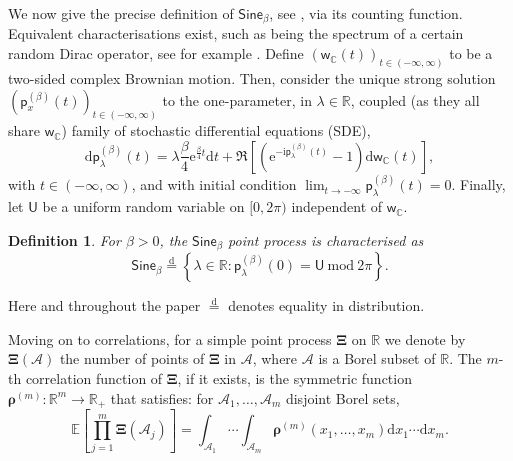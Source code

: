 \documentclass[]{article}
\newtheorem{defn}[thm]{Definition}
\begin{document}
We now give the precise definition of $\mathsf{Sine}_\beta$, see \cite{ValkoViragCarousel,ValkoViragOperators,KillipStoiciu}, via its counting function. Equivalent characterisations exist, such as being the spectrum of a certain random Dirac operator, see for example \cite{ValkoViragOperators}. Define $(\mathsf{w}_\mathbb{C}(t))_{t\in (-\infty,\infty)}$ to be a two-sided complex Brownian motion. Then, consider the unique strong solution $(\mathsf{p}_x^{(\beta)}(t))_{t\in (-\infty,\infty)}$ to the one-parameter, in $\lambda \in \mathbb{R}$, coupled (as they all share $\mathsf{w}_{\mathbb{C}}$) family of stochastic differential equations (SDE),
\begin{equation}\label{SineSDE}
\mathrm{d}\mathsf{p}_\lambda^{(\beta)}(t)=\lambda \frac{\beta}{4}\mathrm{e}^{\frac{\beta}{4}t}\mathrm{d}t+\Re\left[\left(\mathrm{e}^{-\mathrm{i}\mathsf{p}_\lambda^{(\beta)}(t)}-1\right)\mathrm{d}\mathsf{w}_\mathbb{C}(t)\right],
\end{equation}
with $t \in (-\infty,\infty)$,
and with initial condition $\lim_{t\to -\infty}\mathsf{p}^{(\beta)}_{\lambda}(t)=0$. Finally, let $\mathsf{U}$ be a uniform random variable on $[0,2\pi)$ independent of $\mathsf{w}_\mathbb{C}$. 

\begin{defn} 
For $\beta>0$, the $\mathsf{Sine}_\beta$ point process is characterised as
\begin{equation*}
\mathsf{Sine}_\beta\overset{\mathrm{d}}{=} \left\{\lambda \in \mathbb{R}: \mathsf{p}^{(\beta)}_\lambda(0)=\mathsf{U} \ \mathrm{mod} \ 2\pi\right\}.
\end{equation*}
\end{defn}
Here and throughout the paper $\overset{\mathrm{d}}{=}$ denotes equality in distribution.

Moving on to correlations, for a simple point process $\boldsymbol{\Xi}$ on $\mathbb{R}$ we denote by $\boldsymbol{\Xi}(\mathscr{A})$ the number of points of $\boldsymbol{\Xi}$ in $\mathscr{A}$, where $\mathscr{A}$ is a Borel subset of $\mathbb{R}$. The $m$-th correlation function of $\boldsymbol{\Xi}$, if it exists, is the symmetric function $\boldsymbol{\rho}^{(m)}:\mathbb{R}^m\to \mathbb{R}_+$ that satisfies: for $\mathscr{A}_1,\dots,\mathscr{A}_m$ disjoint Borel sets,
\begin{equation*}
\mathbb{E}\left[\prod_{j=1}^m \boldsymbol{\Xi}(\mathscr{A}_j)\right]=\int_{\mathscr{A}_1}\cdots\int_{\mathscr{A}_m}\boldsymbol{\rho}^{(m)}(x_1,\dots,x_m)\mathrm{d}x_1\cdots\mathrm{d}x_m.
\end{equation*}
\end{document}
